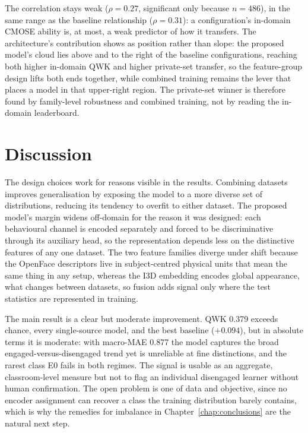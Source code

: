 \documentclass[../main.tex]{subfiles}
\begin{document}
The correlation stays weak ($\rho=0.27$, significant only because $n=486$), in the same range as the baseline relationship ($\rho=0.31$): a configuration's in-domain CMOSE ability is, at most, a weak predictor of how it transfers. The architecture's contribution shows as position rather than slope: the proposed model's cloud lies above and to the right of the baseline configurations, reaching both higher in-domain QWK and higher private-set transfer, so the feature-group design lifts both ends together, while combined training remains the lever that places a model in that upper-right region. The private-set winner is therefore found by family-level robustness and combined training, not by reading the in-domain leaderboard.

\FloatBarrier
\section{Discussion}
\label{sec:gen-discussion}

The design choices work for reasons visible in the results. Combining datasets improves generalisation by exposing the model to a more diverse set of distributions, reducing its tendency to overfit to either dataset. The proposed model's margin widens off-domain for the reason it was designed: each behavioural channel is encoded separately and forced to be discriminative through its auxiliary head, so the representation depends less on the distinctive features of any one dataset. The two feature families diverge under shift because the OpenFace descriptors live in subject-centred physical units that mean the same thing in any setup, whereas the I3D embedding encodes global appearance, what changes between datasets, so fusion adds signal only where the test statistics are represented in training.

The main result is a clear but moderate improvement. QWK 0.379 exceeds chance, every single-source model, and the best baseline ($+0.094$), but in absolute terms it is moderate: with macro-MAE 0.877 the model captures the broad engaged-versus-disengaged trend yet is unreliable at fine distinctions, and the rarest class E0 fails in both regimes. The signal is usable as an aggregate, classroom-level measure but not to flag an individual disengaged learner without human confirmation. The open problem is one of data and objective, since no encoder assignment can recover a class the training distribution barely contains, which is why the remedies for imbalance in Chapter~\ref{chap:conclusions} are the natural next step.
\end{document}
